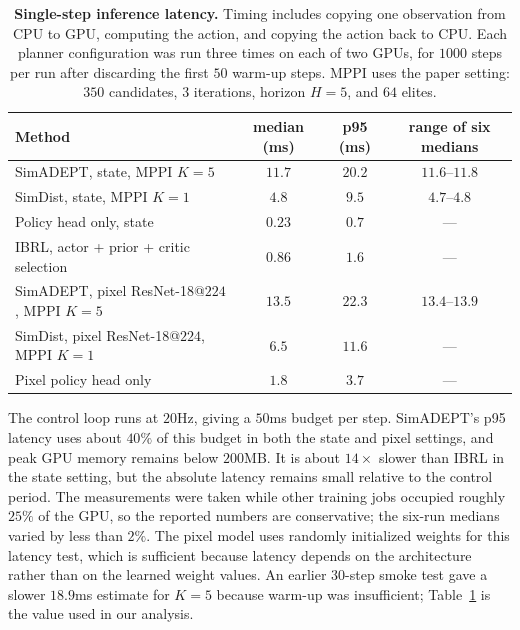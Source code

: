 \documentclass{article} %
\begin{document}
\begin{table}[h]
\centering
\caption{%
  \textbf{Single-step inference latency.} Timing includes copying one
  observation from CPU to GPU, computing the action, and copying the action back
  to CPU. Each planner configuration was run three times on each of two GPUs,
  for $1000$ steps per run after discarding the first $50$ warm-up steps. MPPI
  uses the paper setting: $350$ candidates, $3$ iterations, horizon $H=5$, and
  $64$ elites.}
\label{tab:app-inference-latency}
\small
\begin{tabular}{lccc}
\toprule
Method & median (ms) & p95 (ms) & range of six medians \\
\midrule
SimADEPT, state, MPPI $K=5$ & $11.7$ & $20.2$ & $11.6$--$11.8$ \\
SimDist, state, MPPI $K=1$ & $4.8$ & $9.5$ & $4.7$--$4.8$ \\
Policy head only, state & $0.23$ & $0.7$ & --- \\
IBRL, actor + prior + critic selection & $0.86$ & $1.6$ & --- \\
SimADEPT, pixel ResNet-18@$224$, MPPI $K=5$ & $13.5$ & $22.3$ & $13.4$--$13.9$ \\
SimDist, pixel ResNet-18@$224$, MPPI $K=1$ & $6.5$ & $11.6$ & --- \\
Pixel policy head only & $1.8$ & $3.7$ & --- \\
\bottomrule
\end{tabular}
\end{table}

The control loop runs at $20$Hz, giving a $50$ms budget per step. SimADEPT's
p95 latency uses about $40\%$ of this budget in both the state and pixel
settings, and peak GPU memory remains below $200$MB. It is about $14\times$
slower than IBRL in the state setting, but the absolute latency remains small
relative to the control period. The measurements were taken while other
training jobs occupied roughly $25\%$ of the GPU, so the reported numbers are
conservative; the six-run medians varied by less than $2\%$. The pixel model
uses randomly initialized weights for this latency test, which is sufficient
because latency depends on the architecture rather than on the learned weight
values. An earlier $30$-step smoke test gave a slower $18.9$ms estimate for
$K=5$ because warm-up was insufficient; Table~\ref{tab:app-inference-latency}
is the value used in our analysis.
\end{document}
